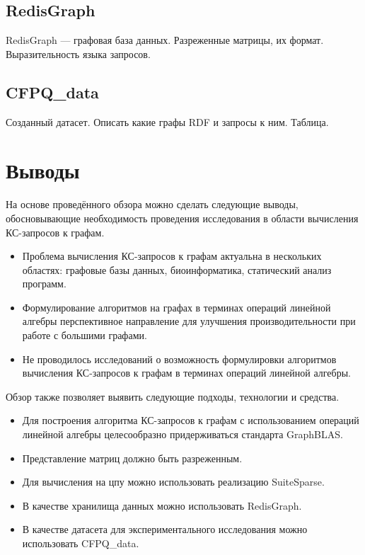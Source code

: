 \subsection{RedisGraph}
RedisGraph --- графовая база данных. Разреженные матрицы, их формат. Выразительность языка запросов.

\subsection{CFPQ\_data}
Созданный датасет. Описать какие графы RDF и запросы к ним. Таблица.

\section{Выводы}\label{sec:ch1/sec6}
На основе проведённого обзора можно сделать следующие выводы, обосновывающие необходимость проведения исследования в области вычисления КС-запросов к графам.
\begin{itemize}
	\item Проблема вычисления КС-запросов к графам актуальна в нескольких областях: графовые базы данных, биоинформатика, статический анализ программ.
	\item Формулирование алгоритмов на графах в терминах операций линейной алгебры перспективное направление для улучшения производительности при работе с большими графами.
	\item Не проводилось исследований о возможность формулировки алгоритмов вычисления КС-запросов к графам в терминах операций линейной алгебры.
\end{itemize}

Обзор также позволяет выявить следующие подходы, технологии и средства.
\begin{itemize}
	\item Для построения алгоритма КС-запросов к графам с использованием операций линейной алгебры целесообразно придерживаться стандарта GraphBLAS.
	\item Представление матриц должно быть разреженным.
	\item Для вычисления на цпу можно использовать реализацию SuiteSparse.
	\item В качестве хранилища данных можно использовать RedisGraph.
	\item В качестве датасета для экспериментального исследования можно использовать CFPQ\_data.
\end{itemize}


\FloatBarrier
